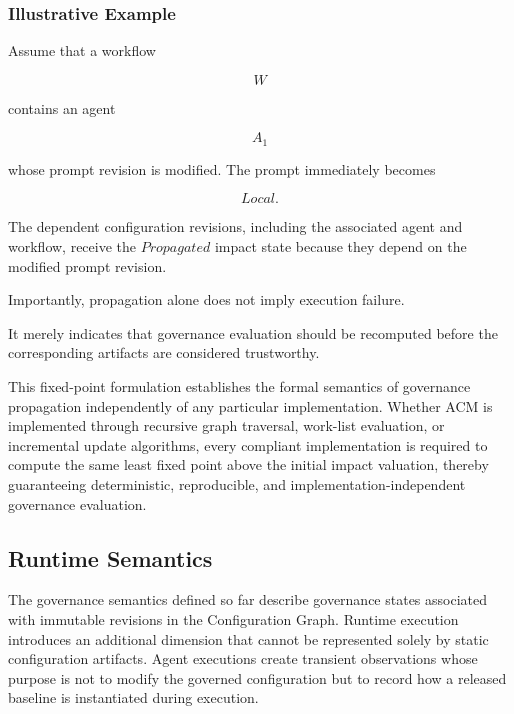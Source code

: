 \documentclass[10pt]{article}
\begin{document}
\subsubsection{Illustrative Example}

Assume that a workflow

\[
W
\]

contains an agent

\[
A_1
\]

whose prompt revision is modified. The prompt immediately becomes

\[
Local.
\]

The dependent configuration revisions, including the associated agent and
workflow, receive the $Propagated$ impact state because they depend on the modified prompt revision.

Importantly, propagation alone does not imply execution failure.

It merely indicates that governance evaluation should be recomputed before the corresponding artifacts are considered trustworthy.



This fixed-point formulation establishes the formal semantics of governance propagation independently of any particular implementation. Whether ACM is implemented through recursive graph traversal, work-list evaluation, or incremental update algorithms, every compliant implementation is required to compute the same least fixed point above the initial impact valuation, thereby guaranteeing deterministic,
reproducible, and implementation-independent governance evaluation.


\subsection{Runtime Semantics}
\label{subsec:runtime_semantics}

The governance semantics defined so far describe governance states associated
with immutable revisions in the Configuration Graph. Runtime execution
introduces an additional dimension that cannot be represented solely by static
configuration artifacts. Agent executions create transient observations whose
purpose is not to modify the governed configuration but to record how a released
baseline is instantiated during execution.
\end{document}
